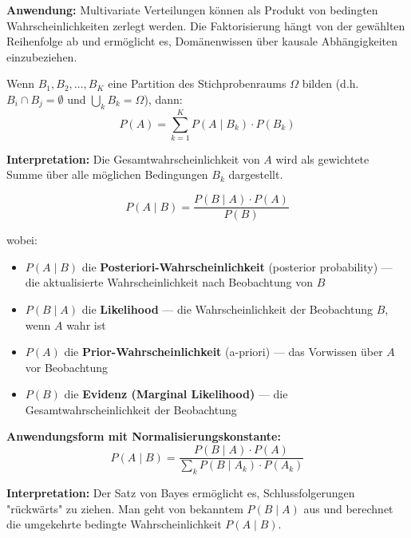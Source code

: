 \textbf{Anwendung:} Multivariate Verteilungen können als Produkt von bedingten Wahrscheinlichkeiten zerlegt werden. Die Faktorisierung hängt von der gewählten Reihenfolge ab und ermöglicht es, Domänenwissen über kausale Abhängigkeiten einzubeziehen.

Wenn $B_1, B_2, \ldots, B_K$ eine Partition des Stichprobenraums $\Omega$ bilden (d.h. $B_i \cap B_j = \emptyset$ und $\bigcup_{k} B_k = \Omega$), dann:
$$P(A) = \sum_{k=1}^{K} P(A \mid B_k) \cdot P(B_k)$$

\textbf{Interpretation:} Die Gesamtwahrscheinlichkeit von $A$ wird als gewichtete Summe über alle möglichen Bedingungen $B_k$ dargestellt.

$$P(A \mid B) = \frac{P(B \mid A) \cdot P(A)}{P(B)}$$

wobei:
\begin{itemize}[leftmargin=1.5em]
    \item $P(A \mid B)$ die \textbf{Posteriori-Wahrscheinlichkeit} (posterior probability) — die aktualisierte Wahrscheinlichkeit nach Beobachtung von $B$
    \item $P(B \mid A)$ die \textbf{Likelihood} — die Wahrscheinlichkeit der Beobachtung $B$, wenn $A$ wahr ist
    \item $P(A)$ die \textbf{Prior-Wahrscheinlichkeit} (a-priori) — das Vorwissen über $A$ vor Beobachtung
    \item $P(B)$ die \textbf{Evidenz (Marginal Likelihood)} — die Gesamtwahrscheinlichkeit der Beobachtung
\end{itemize}

\textbf{Anwendungsform mit Normalisierungskonstante:}
$$P(A \mid B) = \frac{P(B \mid A) \cdot P(A)}{\sum_{k} P(B \mid A_k) \cdot P(A_k)}$$

\textbf{Interpretation:} Der Satz von Bayes ermöglicht es, Schlussfolgerungen "rückwärts" zu ziehen. Man geht von bekanntem $P(B \mid A)$ aus und berechnet die umgekehrte bedingte Wahrscheinlichkeit $P(A \mid B)$.


